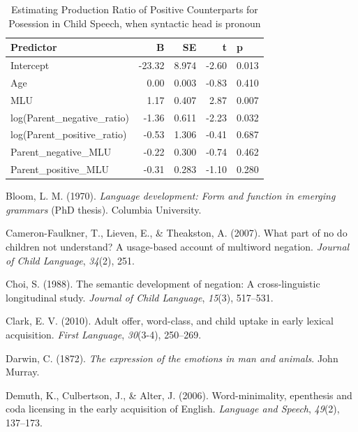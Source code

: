 \documentclass[
  english,
  man,floatsintext]{apa6}
\begin{document}
\begin{table}

\caption{\label{tab:unnamed-chunk-11}Estimating Production Ratio of Positive Counterparts for Posession in Child Speech, when syntactic head is pronoun}
\centering
\begin{tabular}[t]{l|r|r|r|l}
\hline
Predictor & B & SE & t & p\\
\hline
Intercept & -23.32 & 8.974 & -2.60 & 0.013\\
\hline
Age & 0.00 & 0.003 & -0.83 & 0.410\\
\hline
MLU & 1.17 & 0.407 & 2.87 & 0.007\\
\hline
log(Parent\_negative\_ratio) & -1.36 & 0.611 & -2.23 & 0.032\\
\hline
log(Parent\_positive\_ratio) & -0.53 & 1.306 & -0.41 & 0.687\\
\hline
Parent\_negative\_MLU & -0.22 & 0.300 & -0.74 & 0.462\\
\hline
Parent\_positive\_MLU & -0.31 & 0.283 & -1.10 & 0.280\\
\hline
\end{tabular}
\end{table}

\begingroup
\setlength{\parindent}{-0.5in}
\setlength{\leftskip}{0.5in}

\endgroup

\hypertarget{refs}{}
\leavevmode\hypertarget{ref-bloom1970language}{}%
Bloom, L. M. (1970). \emph{Language development: Form and function in emerging grammars} (PhD thesis). Columbia University.

\leavevmode\hypertarget{ref-cameron2007part}{}%
Cameron-Faulkner, T., Lieven, E., \& Theakston, A. (2007). What part of no do children not understand? A usage-based account of multiword negation. \emph{Journal of Child Language}, \emph{34}(2), 251.

\leavevmode\hypertarget{ref-choi1988semantic}{}%
Choi, S. (1988). The semantic development of negation: A cross-linguistic longitudinal study. \emph{Journal of Child Language}, \emph{15}(3), 517--531.

\leavevmode\hypertarget{ref-clark2010adult}{}%
Clark, E. V. (2010). Adult offer, word-class, and child uptake in early lexical acquisition. \emph{First Language}, \emph{30}(3-4), 250--269.

\leavevmode\hypertarget{ref-darwin1872expression}{}%
Darwin, C. (1872). \emph{The expression of the emotions in man and animals}. John Murray.

\leavevmode\hypertarget{ref-demuth2006word}{}%
Demuth, K., Culbertson, J., \& Alter, J. (2006). Word-minimality, epenthesis and coda licensing in the early acquisition of English. \emph{Language and Speech}, \emph{49}(2), 137--173.
\end{document}
